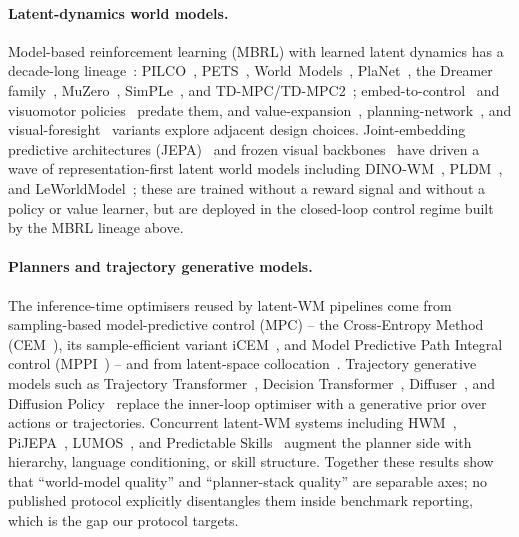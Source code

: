 \documentclass{article}
\begin{document}
\paragraph{Latent-dynamics world models.}
Model-based reinforcement learning (MBRL) with learned latent dynamics has a decade-long lineage~\cite{moerland2023mbrlsurvey,polydoros2017robotmbsurvey}: PILCO~\cite{deisenroth2011pilco}, PETS~\cite{chua2018pets}, World~Models~\cite{ha2018worldmodels}, PlaNet~\cite{hafner2019planet}, the Dreamer family~\cite{hafner2020dreamer,hafner2021dreamerv2,hafner2023dreamerv3}, MuZero~\cite{schrittwieser2020muzero}, SimPLe~\cite{kaiser2020simple}, and TD-MPC/TD-MPC2~\cite{hansen2022tdmpc,hansen2024tdmpc2}; embed-to-control~\cite{watter2015embed} and visuomotor policies~\cite{levine2016visuomotor} predate them, and value-expansion~\cite{buckman2018steve,feinberg2018mve,pong2018tdmodels}, planning-network~\cite{tamar2016vin,oh2017vpn,farquhar2018treeqn,racaniere2017iaa}, and visual-foresight~\cite{ebert2018visualforesight} variants explore adjacent design choices. Joint-embedding predictive architectures (JEPA)~\cite{assran2023ijepa,balestriero2025lejepa} and frozen visual backbones~\cite{oquab2023dinov2,nair2022r3m} have driven a wave of representation-first latent world models including DINO-WM~\cite{zhou2025dinowm}, PLDM~\cite{sobal2025pldm}, and LeWorldModel~\cite{maes2026leworldmodel}; these are trained without a reward signal and without a policy or value learner, but are deployed in the closed-loop control regime built by the MBRL lineage above.

\paragraph{Planners and trajectory generative models.}
The inference-time optimisers reused by latent-WM pipelines come from sampling-based model-predictive control (MPC) -- the Cross-Entropy Method (CEM~\cite{rubinstein2004crossentropy}), its sample-efficient variant iCEM~\cite{pinneri2020icem}, and Model Predictive Path Integral control (MPPI~\cite{williams2017mppi}) -- and from latent-space collocation~\cite{rybkin2021latco}. Trajectory generative models such as Trajectory Transformer~\cite{janner2021trajectorytransformer}, Decision Transformer~\cite{chen2021decisiontransformer}, Diffuser~\cite{janner2022diffuser}, and Diffusion Policy~\cite{chi2025diffusionpolicy} replace the inner-loop optimiser with a generative prior over actions or trajectories. Concurrent latent-WM systems including HWM~\cite{zhang2026hwm}, PiJEPA~\cite{chahe2026pijepa}, LUMOS~\cite{nematollahi2025lumos}, and Predictable Skills~\cite{guertler2025predictableskills} augment the planner side with hierarchy, language conditioning, or skill structure. Together these results show that ``world-model quality'' and ``planner-stack quality'' are separable axes; no published protocol explicitly disentangles them inside benchmark reporting, which is the gap our protocol targets.
\end{document}
